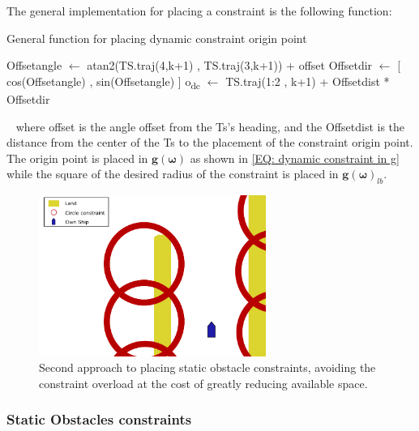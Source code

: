 The general implementation for placing a constraint is the following function:
\begin{algorithm}[ht]
    \caption{General function for placing dynamic constraint origin point}
    \label{ALG: dynamic constraint origin}
    \begin{algorithmic}
        \State Offsetangle $\gets$ atan2(TS.traj(4,k+1) , TS.traj(3,k+1)) + offset
        \State Offsetdir $\gets$ [ cos(Offsetangle) , sin(Offsetangle) ]
        \State o\textsubscript{dc} $\gets$ TS.traj(1:2 , k+1) + Offsetdist * Offsetdir
    \end{algorithmic}
\end{algorithm}
 \newline
where offset is the angle offset from the \gls{Ts}'s heading, and the Offsetdist is the distance from the center of the
\gls{Ts} to the placement of the constraint origin point. The origin point is placed in $\textbf{g}(\bm{\omega})$
as shown in \eqref{EQ: dynamic constraint in g} while the square of the desired radius of the constraint is placed in
$\textbf{g}(\bm{\omega})_{lb}$.


\begin{figure}[ht!]
    \centering 
    \includegraphics[width=0.66\textwidth]{Images/StaticObs_Naive2.pdf}
    \caption{Second approach to placing static obstacle constraints, avoiding the constraint overload at the cost of greatly reducing available space.}     \label{FIG: Static Obs Naive approach 2}
\end{figure}

\subsubsection*{Static Obstacles constraints} \label{Chap: Method Static Obs}

